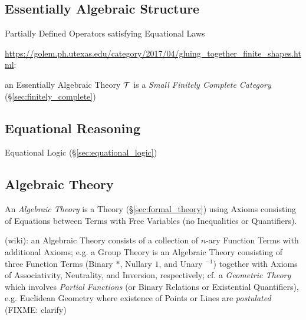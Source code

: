 \subsection{Essentially Algebraic Structure}
\label{sec:essentially_algebraic}

Partially Defined Operators satisfying Equational Laws

\url{https://golem.ph.utexas.edu/category/2017/04/gluing_together_finite_shapes.html}:

an Essentially Algebraic Theory $\mathcal{T}$ is a \emph{Small Finitely Complete
  Category} (\S\ref{sec:finitely_complete})



\subsection{Equational Reasoning}\label{sec:equational_reasoning}

Equational Logic (\S\ref{sec:equational_logic})



\subsection{Algebraic Theory}\label{sec:algebraic_theory}

An \emph{Algebraic Theory} is a Theory (\S\ref{sec:formal_theory}) using Axioms
consisting of Equations between Terms with Free Variables (no Inequalities or
Quantifiers).

(wiki): an Algebraic Theory consists of a collection of $n$-ary Function Terms
with additional Axioms; e.g. a Group Theory is an Algebraic Theory consisting of
three Function Terms (Binary $*$, Nullary $1$, and Unary $^{-1}$) together with
Axioms of Associativity, Neutrality, and Inversion, respectively; cf. a
\emph{Geometric Theory} which involves \emph{Partial Functions} (or Binary
Relations or Existential Quantifiers), e.g. Euclidean Geometry where existence
of Points or Lines are \emph{postulated} (FIXME: clarify)

